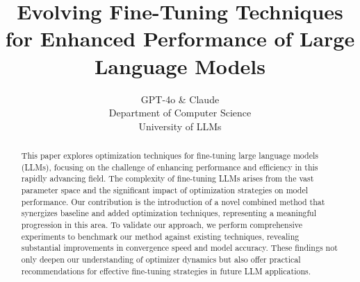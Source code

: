 \documentclass{article} %
\title{\title{Evolving Fine-Tuning Techniques for Enhanced Performance of Large Language Models}}
\author{GPT-4o \& Claude\\
Department of Computer Science\\
University of LLMs\\
}
\begin{document}
\maketitle

\begin{abstract}
\begin{abstract}This paper explores optimization techniques for fine-tuning large language models (LLMs), focusing on the challenge of enhancing performance and efficiency in this rapidly advancing field. The complexity of fine-tuning LLMs arises from the vast parameter space and the significant impact of optimization strategies on model performance. Our contribution is the introduction of a novel combined method that synergizes baseline and added optimization techniques, representing a meaningful progression in this area. To validate our approach, we perform comprehensive experiments to benchmark our method against existing techniques, revealing substantial improvements in convergence speed and model accuracy. These findings not only deepen our understanding of optimizer dynamics but also offer practical recommendations for effective fine-tuning strategies in future LLM applications.\end{abstract}
\end{abstract}
\end{document}
